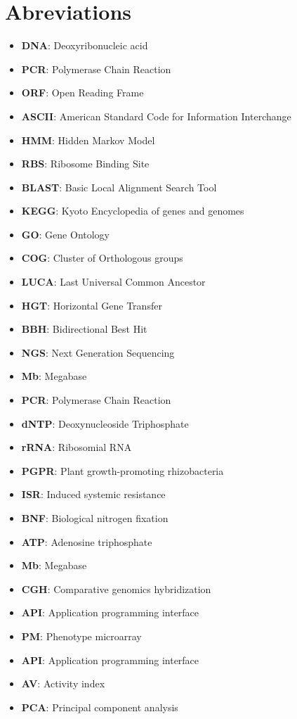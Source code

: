 \logvartrue
\chapter{Abreviations}

\begin{itemize}
\item \textbf{DNA}: Deoxyribonucleic acid
\item \textbf{PCR}: Polymerase Chain Reaction
\item \textbf{ORF}: Open Reading Frame
\item \textbf{ASCII}: American Standard Code for Information Interchange
\item \textbf{HMM}: Hidden Markov Model
\item \textbf{RBS}: Ribosome Binding Site
\item \textbf{BLAST}: Basic Local Alignment Search Tool
\item \textbf{KEGG}: Kyoto Encyclopedia of genes and genomes
\item \textbf{GO}: Gene Ontology
\item \textbf{COG}: Cluster of Orthologous groups
\item \textbf{LUCA}: Last Universal Common Ancestor
\item \textbf{HGT}: Horizontal Gene Transfer
\item \textbf{BBH}: Bidirectional Best Hit
\item \textbf{NGS}: Next Generation Sequencing
\item \textbf{Mb}: Megabase
\item \textbf{PCR}: Polymerase Chain Reaction
\item \textbf{dNTP}: Deoxynucleoside Triphosphate
\item \textbf{rRNA}: Ribosomial RNA
\item \textbf{PGPR}: Plant growth-promoting rhizobacteria
\item \textbf{ISR}: Induced systemic resistance
\item \textbf{BNF}: Biological nitrogen fixation
\item \textbf{ATP}: Adenosine triphosphate
\item \textbf{Mb}: Megabase
\item \textbf{CGH}: Comparative genomics hybridization
\item \textbf{API}: Application programming interface
\item \textbf{PM}: Phenotype microarray
\item \textbf{API}: Application programming interface
\item \textbf{AV}: Activity index
\item \textbf{PCA}: Principal component analysis
\end{itemize}